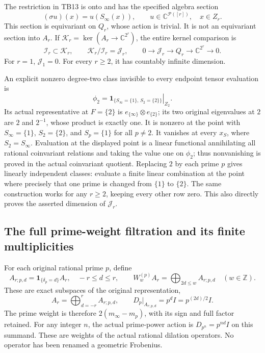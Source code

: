 The restriction in TB13 is onto and has the specified algebra
section
\[
(\sigma u)(x)=u(S_\infty(x)),\qquad
u\in\mathbb C^{\mathcal P([r])},\quad x\in Z_r.
\tag{TB15}
\]
This section is equivariant on \(Q_r\), whose action is trivial.
It is not an equivariant section into \(A_r\).
If \(\mathcal K_r=\ker(A_r\to\mathbb C^{2^r})\), the entire
kernel comparison is
\[
\mathcal I_r\subset\mathcal K_r,\qquad
\mathcal K_r/\mathcal I_r=\mathcal J_r,\qquad
0\to\mathcal J_r\to Q_r\to\mathbb C^{2^r}\to0.
\tag{TB16}
\]
For \(r=1\), \(\mathcal J_1=0\). For every \(r\ge2\), it has
countably infinite dimension.

An explicit nonzero degree-two class invisible to every endpoint
tensor evaluation is
\[
\phi_2=\left.
\mathbf1_{\{S_\infty=\{1\},\,S_2=\{2\}\}}
\right|_{Z_2}.
\tag{TB17}
\]
Its actual representative at \(F=\{2\}\) is
\(e_{\{\infty\}}\otimes e_{\{2\}}\); its two original eigenvalues
at \(2\) are \(2\) and \(2^{-1}\), whose product is exactly one.
It is nonzero at the point with \(S_\infty=\{1\}\),
\(S_2=\{2\}\), and \(S_p=\{1\}\) for all \(p\ne2\).
It vanishes at every \(x_S\), where \(S_2=S_\infty\).
Evaluation at the displayed point is a linear functional
annihilating all rational coinvariant relations and taking the
value one on \(\phi_2\); thus nonvanishing is proved in the actual
coinvariant quotient.
Replacing \(2\) by each prime \(p\) gives linearly independent
classes: evaluate a finite linear combination at the point
where precisely that one prime is changed from \(\{1\}\) to
\(\{2\}\). The same construction works for any \(r\ge2\), keeping
every other row zero. This also directly proves the asserted
dimension of \(\mathcal J_r\).

\subsection{The full prime-weight filtration and its finite multiplicities}

For each original rational prime \(p\), define
\[
A_{r;p,d}=\mathbf1_{\{\delta_p=d\}}A_r,\quad -r\le d\le r,
\qquad
W^{(p)}_w A_r=\bigoplus_{2d\le w}A_{r;p,d}
\quad(w\in\mathbb Z).
\tag{TB18}
\]
These are exact subspaces of the original representation,
\[
A_r=\bigoplus_{d=-r}^r A_{r;p,d},\qquad
D_p|_{A_{r;p,d}}=p^d I=p^{(2d)/2}I.
\tag{TB19}
\]
The prime weight is therefore \(2(m_\infty-m_p)\), with its sign
and full factor retained. For any integer \(n\), the actual
prime-power action is \(D_{p^n}=p^{nd}I\) on this summand.
These are weights of the actual rational dilation operators.
No operator has been renamed a geometric Frobenius.

